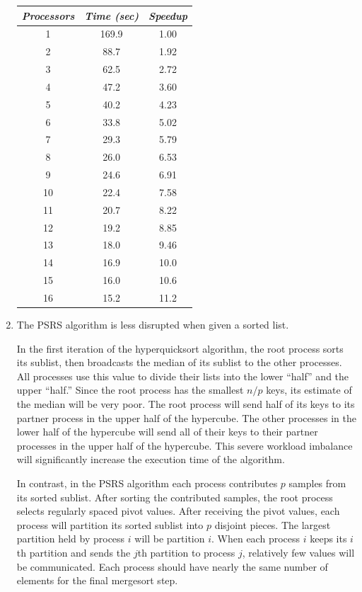 \begin{enumerate}
\begin{tabular}{|c|c|c|}
\hline
{\it Processors}&{\it Time (sec)}&{\it Speedup}\\
\hline
1 & 169.9 & 1.00 \\
2 & 88.7 & 1.92 \\
3 & 62.5 & 2.72 \\
4 & 47.2 & 3.60 \\
5 & 40.2 & 4.23 \\
6 & 33.8 & 5.02 \\
7 & 29.3 & 5.79 \\
8 & 26.0 & 6.53 \\
9 & 24.6 & 6.91 \\
10 & 22.4 & 7.58 \\
11 & 20.7 & 8.22 \\
12 & 19.2 & 8.85 \\
13 & 18.0 & 9.46 \\
14 & 16.9 & 10.0 \\
15 & 16.0 & 10.6 \\
16 & 15.2 & 11.2 \\
\hline
\end{tabular}

\item The PSRS algorithm is less disrupted when given a sorted list.

In the first iteration of the hyperquicksort algorithm, the
root process sorts its sublist, then broadcasts the median of its sublist
to the other processes. All processes use this value to divide their lists
into the lower ``half'' and the upper ``half.''
Since the root process has the smallest $n/p$ keys, its estimate of the
median will be very poor.
The root process will send half of its keys to its partner process in the
upper half of the hypercube.
The other processes in the lower half of the hypercube will send all of
their keys to their partner processes in the upper half of the hypercube.
This severe workload imbalance will significantly increase the execution time
of the algorithm.

In contrast, in the PSRS algorithm each process contributes $p$ samples from
its sorted sublist. After sorting the contributed samples, the root process
selects regularly spaced pivot values.
After receiving the pivot values, each process will partition its sorted
sublist into $p$ disjoint pieces.
The largest partition held by process $i$ will be partition $i$.
When each process $i$ keeps its $i$th partition and sends the $j$th
partition to process $j$, relatively few values will be communicated.
Each process should have nearly the same number of elements for the
final mergesort step.


\end{enumerate}
